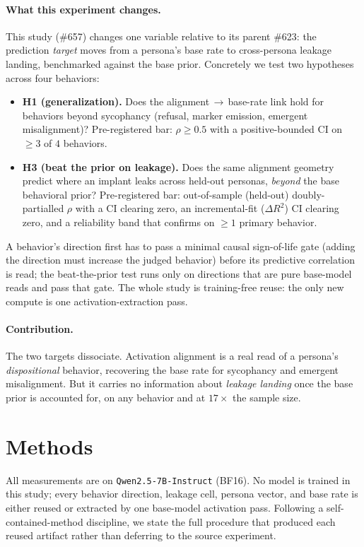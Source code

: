 \documentclass[11pt]{article}
\let\mathrho\rho
\renewcommand{\rho}{\ensuremath{\mathrho}}
\begin{document}
\paragraph{What this experiment changes.}
This study (\#657) changes one variable relative to its parent \#623: the prediction
\emph{target} moves from a persona's base rate to cross-persona leakage landing,
benchmarked against the base prior. Concretely we test two hypotheses across four
behaviors:
\begin{itemize}[leftmargin=1.4em,topsep=2pt,itemsep=1pt]
  \item \textbf{H1 (generalization).} Does the alignment\,$\to$\,base-rate link hold for
  behaviors beyond sycophancy (refusal, marker emission, emergent misalignment)?
  Pre-registered bar: $\rho\ge 0.5$ with a positive-bounded CI on $\ge 3$ of $4$ behaviors.
  \item \textbf{H3 (beat the prior on leakage).} Does the same alignment geometry predict
  where an implant leaks across held-out personas, \emph{beyond} the base behavioral
  prior? Pre-registered bar: out-of-sample (held-out) doubly-partialled $\rho$ with a
  CI clearing zero, an incremental-fit ($\Delta R^2$) CI clearing zero, and a reliability
  band that confirms on $\ge 1$ primary behavior.
\end{itemize}
A behavior's direction first has to pass a minimal causal sign-of-life gate (adding the
direction must increase the judged behavior) before its predictive correlation is read;
the beat-the-prior test runs only on directions that are pure base-model reads and pass
that gate. The whole study is training-free reuse: the only new compute is one
activation-extraction pass.

\paragraph{Contribution.}
The two targets dissociate. Activation alignment is a real read of a persona's
\emph{dispositional} behavior, recovering the base rate for sycophancy and emergent
misalignment. But it carries no information about \emph{leakage landing} once the base
prior is accounted for, on any behavior and at $17\times$ the sample size.

\section{Methods}
\label{sec:methods}

All measurements are on \texttt{Qwen2.5-7B-Instruct} (BF16). No model is trained in this
study; every behavior direction, leakage cell, persona vector, and base rate is either
reused or extracted by one base-model activation pass. Following a self-contained-method
discipline, we state the full procedure that produced each reused artifact rather than
deferring to the source experiment.
\end{document}
